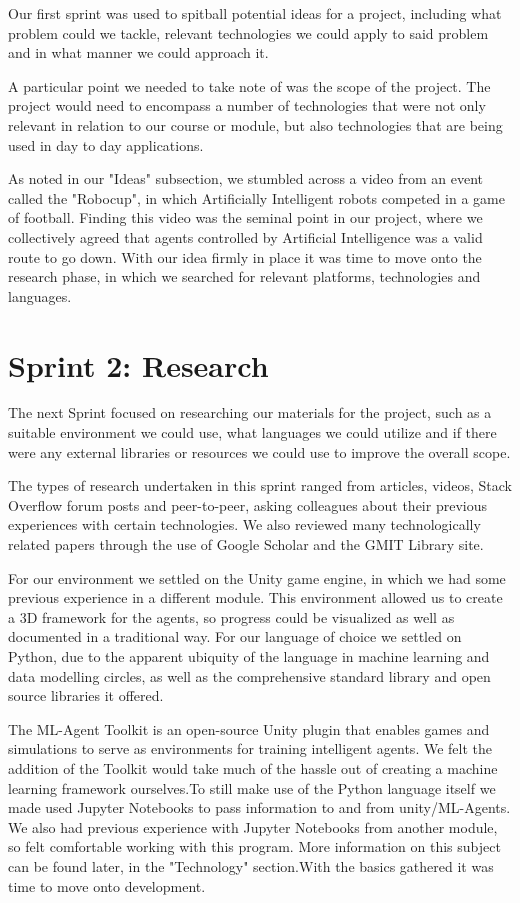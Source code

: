 	Our first sprint was used to spitball potential ideas for a project, including what problem could we tackle, relevant technologies we could apply to said problem and in what manner we could approach it.
	
	A particular point we needed to take note of was the scope of the project. The project would need to encompass a number of technologies that were not only relevant in relation to our course or module, but also technologies that are being used in day to day applications. 
	
	As noted in our "Ideas" subsection, we stumbled across a video from an event called the "Robocup", in which Artificially Intelligent robots competed in a game of football. Finding this video was the seminal point in our project, where we collectively agreed that agents controlled by Artificial Intelligence was a valid route to go down. With our idea firmly in place it was time to move onto the research phase, in which we searched for relevant platforms, technologies and languages.
	
\section{Sprint 2: Research}
	
	The next Sprint focused on researching our materials for the project, such as a suitable environment we could use, what languages we could utilize and if there were any external libraries or resources we could use to improve the overall scope.
	
	The types of research undertaken in this sprint ranged from articles, videos, Stack Overflow forum posts and peer-to-peer, asking colleagues about their previous experiences with certain technologies. We also reviewed many technologically related papers through the use of Google Scholar and the GMIT Library site.
	
	For our environment we settled on the Unity game engine, in which we had some previous experience in a different module. This environment allowed us to create a 3D framework for the agents, so progress could be visualized as well as documented in a traditional way. For our language of choice we settled on Python, due to the apparent ubiquity of the language in machine learning and data modelling circles, as well as the comprehensive standard library and open source libraries it offered.

	The ML-Agent Toolkit is an open-source Unity plugin that enables games and simulations to serve as environments for training intelligent agents. We felt the addition of the Toolkit would take much of the hassle out of creating a machine learning framework ourselves.To still make use of the Python language itself we made used  Jupyter Notebooks to pass information to and from unity/ML-Agents. We also had previous experience with Jupyter Notebooks from another module, so felt comfortable working with this program.
	More information on this subject can be found later, in the "Technology" section.With the basics gathered it was time to move onto development.
	

